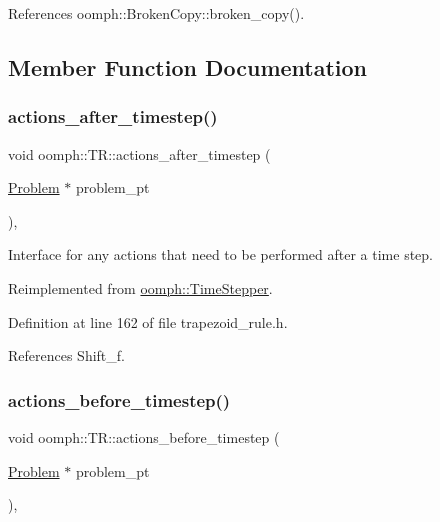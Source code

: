 References oomph\+::\+Broken\+Copy\+::broken\+\_\+copy().



\subsection{Member Function Documentation}
\mbox{\label{classoomph_1_1TR_ae6a606637401e9ed5ca030fa7b28d89a}} 
\subsubsection{\texorpdfstring{actions\+\_\+after\+\_\+timestep()}{actions\_after\_timestep()}}
{\footnotesize\ttfamily void oomph\+::\+T\+R\+::actions\+\_\+after\+\_\+timestep (\begin{DoxyParamCaption}\item[{\hyperlink{classoomph_1_1Problem}{Problem} $\ast$}]{problem\+\_\+pt }\end{DoxyParamCaption})\hspace{0.3cm}{\ttfamily [inline]}, {\ttfamily [virtual]}}

Interface for any actions that need to be performed after a time step. 

Reimplemented from \hyperlink{classoomph_1_1TimeStepper_a3a0fabf83f9bdc89800cd3501df2c586}{oomph\+::\+Time\+Stepper}.



Definition at line 162 of file trapezoid\+\_\+rule.\+h.



References Shift\+\_\+f.

\mbox{\label{classoomph_1_1TR_aa8ba8454bc4fcc3ad3c95550663df388}} 
\subsubsection{\texorpdfstring{actions\+\_\+before\+\_\+timestep()}{actions\_before\_timestep()}}
{\footnotesize\ttfamily void oomph\+::\+T\+R\+::actions\+\_\+before\+\_\+timestep (\begin{DoxyParamCaption}\item[{\hyperlink{classoomph_1_1Problem}{Problem} $\ast$}]{problem\+\_\+pt }\end{DoxyParamCaption})\hspace{0.3cm}{\ttfamily [inline]}, {\ttfamily [virtual]}}

